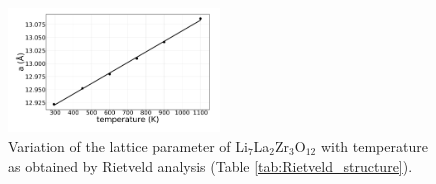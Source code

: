 \documentclass[twoside,twocolumn,9pt]{article}
\begin{document}

\begin{figure}[t]
\centering
\includegraphics[width=0.5\textwidth]{Pics/lattice.pdf}
\caption{Variation of the lattice parameter of Li$_7$La$_2$Zr$_3$O$_{12}$ with temperature as obtained by Rietveld analysis (Table \ref{tab:Rietveld_structure}). }
\label{fig:lattice}
\end{figure}

\end{document}
